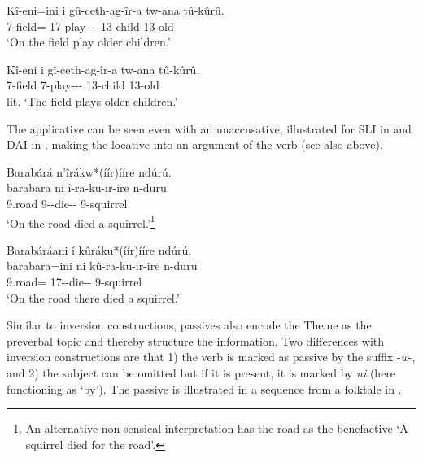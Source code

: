 \documentclass[output=paper]{langscibook}
\begin{document}
\ex
\gll
Kî-eni=ini  i  gû-ceth-ag-îr-a  tw-ana  tû-kûrû.\\
7-field=\LOC{} \FOC{}  17\SM{}-play-\HAB-\APPL-\FV{} 13-child  13-old\\
\glt
‘On the field play older children.’

\ex
\gll
Kî-eni  i  gî-ceth-ag-îr-a  tw-ana  tû-kûrû.\\
7-field \FOC{}  7\SM{}-play-\HAB-\APPL-\FV{} 13-child  13-old\\
\glt
lit. ‘The field plays older children.’

\z
\z

The applicative can be seen even with an unaccusative, illustrated for SLI in  and DAI in , making the locative into an argument of the verb (see also  above).

\ea
\label{bkm:Ref117492221}
Barabárá n’îrákw*(íír)ííre ndúrú.\\
\gll
barabara  ni  î-ra-ku-ir-ire  n-duru\\
9.road \FOC{} 9\SM{}-\YPST{}-die-\APPL-\PFV{} 9-squirrel\\
\glt
‘On the road died a squirrel.’\footnote{An alternative non-sensical interpretation has the road as the benefactive ‘A squirrel died for the road’.}

\z

\ea
\label{bkm:Ref117492230}
Barabáráani í kûráku*(íír)ííre ndúrú.\\
\gll
barabara=ini  ni  kû-ra-ku-ir-ire  n-duru\\
9.road=\LOC{} \FOC{} 17\SM{}-\YPST{}-die-\APPL{}-\PFV{} 9-squirrel\\
\glt
‘On the road there died a squirrel.’

\z


Similar to inversion constructions, passives also encode the Theme as the preverbal topic and thereby structure the information. Two differences with inversion constructions are that 1) the verb is marked as passive by the suffix -\textit{w}-, and 2) the subject can be omitted but if it is present, it is marked by \textit{ni} (here functioning as ‘by’). The passive is illustrated in a sequence from a folktale in .
\end{document}
